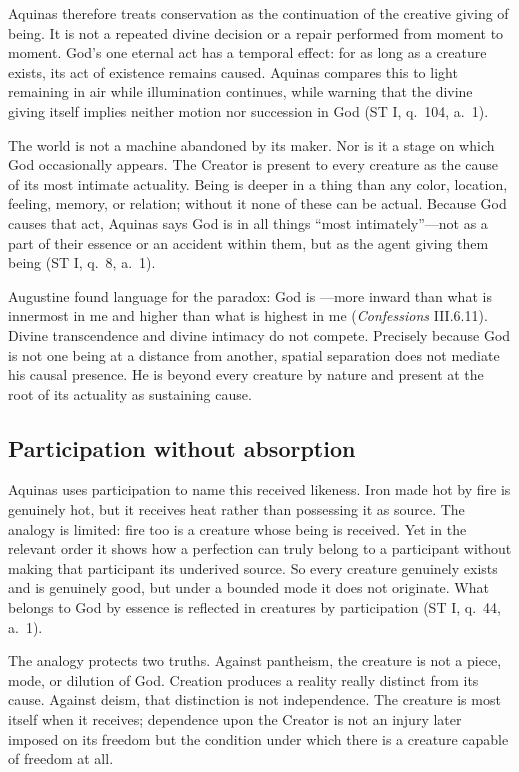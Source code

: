 Aquinas therefore treats conservation as the continuation of the creative giving of being. It is not a repeated divine decision or a repair performed from moment to moment. God's one eternal act has a temporal effect: for as long as a creature exists, its act of existence remains caused. Aquinas compares this to light remaining in air while illumination continues, while warning that the divine giving itself implies neither motion nor succession in God (ST I, q.~104, a.~1).

The world is not a machine abandoned by its maker. Nor is it a stage on which God occasionally appears. The Creator is present to every creature as the cause of its most intimate actuality. Being is deeper in a thing than any color, location, feeling, memory, or relation; without it none of these can be actual. Because God causes that act, Aquinas says God is in all things ``most intimately''---not as a part of their essence or an accident within them, but as the agent giving them being (ST I, q.~8, a.~1).

Augustine found language for the paradox: God is ---more inward than what is innermost in me and higher than what is highest in me (\emph{Confessions} III.6.11). Divine transcendence and divine intimacy do not compete. Precisely because God is not one being at a distance from another, spatial separation does not mediate his causal presence. He is beyond every creature by nature and present at the root of its actuality as sustaining cause.

\subsection{Participation without absorption}

Aquinas uses participation to name this received likeness. Iron made hot by fire is genuinely hot, but it receives heat rather than possessing it as source. The analogy is limited: fire too is a creature whose being is received. Yet in the relevant order it shows how a perfection can truly belong to a participant without making that participant its underived source. So every creature genuinely exists and is genuinely good, but under a bounded mode it does not originate. What belongs to God by essence is reflected in creatures by participation (ST I, q.~44, a.~1).

The analogy protects two truths. Against pantheism, the creature is not a piece, mode, or dilution of God. Creation produces a reality really distinct from its cause. Against deism, that distinction is not independence. The creature is most itself when it receives; dependence upon the Creator is not an injury later imposed on its freedom but the condition under which there is a creature capable of freedom at all.

